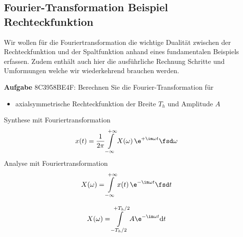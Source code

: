 \clearpage
\subsection{Fourier-Transformation Beispiel Rechteckfunktion}
\label{sec:8C3958BE4F}
\begin{Ziel}
Wir wollen für die Fouriertransformation die wichtige Dualität zwischen der
Rechteckfunktion und der Spaltfunktion anhand eines fundamentalen Beispiels erfassen.
Zudem enthält auch hier die ausführliche Rechnung Schritte und Umformungen
welche wir wiederkehrend brauchen werden.
\end{Ziel}
\textbf{Aufgabe} {\tiny 8C3958BE4F}: Berechnen Sie die Fourier-Transformation für
\begin{itemize}
\item axialsymmetrische Rechteckfunktion der Breite $T_h$ und Amplitude $A$
\end{itemize}

\begin{figure}[h!]
\centering
{}
\end{figure}

\begin{Werkzeug}
Synthese mit Fouriertransformation
\begin{align}
x(t) = \frac{1}{2\pi} \int\limits_{-\infty}^{+\infty} X(\omega) \, \e^{+\im \omega t} \fsd \omega
\end{align}
%
Analyse mit Fouriertransformation
\begin{align}
X(\omega) = \int\limits_{-\infty}^{+\infty} x(t) \, \e^{-\im \omega t} \fsd t
\end{align}
\end{Werkzeug}

\begin{Ansatz}
\begin{equation}
X(\omega) = \int\limits_{-T_h/2}^{+T_h/2} A \e^{-\im \omega t} \mathrm{d}t
\end{equation}
\end{Ansatz}

